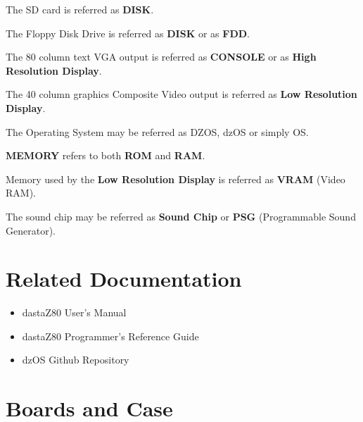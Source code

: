 \documentclass[a4paper,11pt]{article}
\begin{document}
    The SD card is referred as \textbf{DISK}.

    The Floppy Disk Drive is referred as \textbf{DISK} or as \textbf{FDD}.

    The 80 column text VGA output is referred as \textbf{CONSOLE} or as
    \textbf{High Resolution Display}.

    The 40 column graphics Composite Video output is referred as \textbf{Low
    Resolution Display}.

    The Operating System may be referred as DZOS, dzOS or simply OS.

    \textbf{MEMORY} refers to both \textbf{ROM} and \textbf{RAM}.

    Memory used by the \textbf{Low Resolution Display} is referred as
    \textbf{VRAM} (Video RAM).

    The sound chip may be referred as \textbf{Sound Chip} or \textbf{PSG}
    (Programmable Sound Generator).

    \pagebreak
    \section*{Related Documentation}
    \begin{itemize}
        \item dastaZ80 User's Manual\cite{dastaz80userman}
        \item dastaZ80 Programmer's Reference Guide\cite{dastaz80progref}
        \item dzOS Github Repository\cite{dastaZ80github}
    \end{itemize}

    \pagebreak
    \tableofcontents

    \pagebreak
    \pagestyle{fancy}
    \fancyhf{}
    \fancyfoot[R]{\thepage}
    \setcounter{page}{1}

    \section{Boards and Case}
\end{document}
